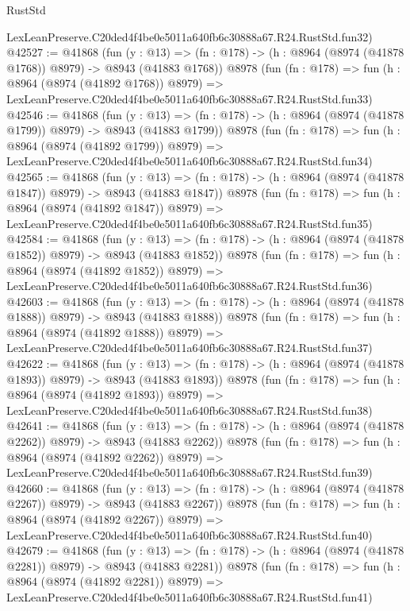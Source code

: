 \begin{lexlean}{RustStd}
\begin{coremodule}
    LexLeanPreserve.C20ded4f4be0e5011a640fb6c30888a67.R24.RustStd.fun32)
@42527 := @41868
    (fun (y : @13) =>
    (fn : @178) -> (h : @8964 (@8974 (@41878 @1768)) @8979) -> @8943 (@41883 @1768))
    @8978
    (fun (fn : @178) =>
    fun (h : @8964 (@8974 (@41892 @1768)) @8979) =>
    LexLeanPreserve.C20ded4f4be0e5011a640fb6c30888a67.R24.RustStd.fun33)
@42546 := @41868
    (fun (y : @13) =>
    (fn : @178) -> (h : @8964 (@8974 (@41878 @1799)) @8979) -> @8943 (@41883 @1799))
    @8978
    (fun (fn : @178) =>
    fun (h : @8964 (@8974 (@41892 @1799)) @8979) =>
    LexLeanPreserve.C20ded4f4be0e5011a640fb6c30888a67.R24.RustStd.fun34)
@42565 := @41868
    (fun (y : @13) =>
    (fn : @178) -> (h : @8964 (@8974 (@41878 @1847)) @8979) -> @8943 (@41883 @1847))
    @8978
    (fun (fn : @178) =>
    fun (h : @8964 (@8974 (@41892 @1847)) @8979) =>
    LexLeanPreserve.C20ded4f4be0e5011a640fb6c30888a67.R24.RustStd.fun35)
@42584 := @41868
    (fun (y : @13) =>
    (fn : @178) -> (h : @8964 (@8974 (@41878 @1852)) @8979) -> @8943 (@41883 @1852))
    @8978
    (fun (fn : @178) =>
    fun (h : @8964 (@8974 (@41892 @1852)) @8979) =>
    LexLeanPreserve.C20ded4f4be0e5011a640fb6c30888a67.R24.RustStd.fun36)
@42603 := @41868
    (fun (y : @13) =>
    (fn : @178) -> (h : @8964 (@8974 (@41878 @1888)) @8979) -> @8943 (@41883 @1888))
    @8978
    (fun (fn : @178) =>
    fun (h : @8964 (@8974 (@41892 @1888)) @8979) =>
    LexLeanPreserve.C20ded4f4be0e5011a640fb6c30888a67.R24.RustStd.fun37)
@42622 := @41868
    (fun (y : @13) =>
    (fn : @178) -> (h : @8964 (@8974 (@41878 @1893)) @8979) -> @8943 (@41883 @1893))
    @8978
    (fun (fn : @178) =>
    fun (h : @8964 (@8974 (@41892 @1893)) @8979) =>
    LexLeanPreserve.C20ded4f4be0e5011a640fb6c30888a67.R24.RustStd.fun38)
@42641 := @41868
    (fun (y : @13) =>
    (fn : @178) -> (h : @8964 (@8974 (@41878 @2262)) @8979) -> @8943 (@41883 @2262))
    @8978
    (fun (fn : @178) =>
    fun (h : @8964 (@8974 (@41892 @2262)) @8979) =>
    LexLeanPreserve.C20ded4f4be0e5011a640fb6c30888a67.R24.RustStd.fun39)
@42660 := @41868
    (fun (y : @13) =>
    (fn : @178) -> (h : @8964 (@8974 (@41878 @2267)) @8979) -> @8943 (@41883 @2267))
    @8978
    (fun (fn : @178) =>
    fun (h : @8964 (@8974 (@41892 @2267)) @8979) =>
    LexLeanPreserve.C20ded4f4be0e5011a640fb6c30888a67.R24.RustStd.fun40)
@42679 := @41868
    (fun (y : @13) =>
    (fn : @178) -> (h : @8964 (@8974 (@41878 @2281)) @8979) -> @8943 (@41883 @2281))
    @8978
    (fun (fn : @178) =>
    fun (h : @8964 (@8974 (@41892 @2281)) @8979) =>
    LexLeanPreserve.C20ded4f4be0e5011a640fb6c30888a67.R24.RustStd.fun41)

\end{coremodule}
\end{lexlean}
